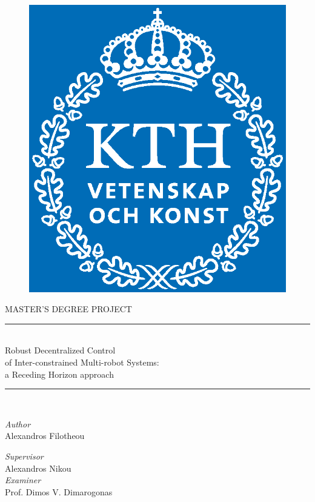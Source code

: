 \begin{titlepage}

\begin{figure}\centering
  \includegraphics[scale=0.25]{./figures/KTH_Logotyp_CMYK_2013.eps} \\[0.8cm]
\end{figure}



 \begin{center}
    \Large MASTER'S DEGREE PROJECT\\[0.8cm]

  \rule{350pt}{4pt} \\[0.3cm]
    \LARGE{Robust Decentralized Control \\
      of Inter-constrained Multi-robot Systems: \\
      a Receding Horizon approach} \\[0.3cm]
  \rule{350pt}{4pt} \\[2cm]

  \begin{minipage}{0.4\textwidth}
  \begin{flushleft} \large
  \emph{Author} \\
    Alexandros Filotheou
  \end{flushleft}
  \end{minipage}
  \begin{minipage}{0.4\textwidth}
  \begin{flushright} \large
  \emph{Supervisor} \\
    Alexandros Nikou \\
    \emph{Examiner} \\
    Prof. Dimos V. Dimarogonas
  \end{flushright}
  \end{minipage}
  \vfill


\end{center}
\end{titlepage}
